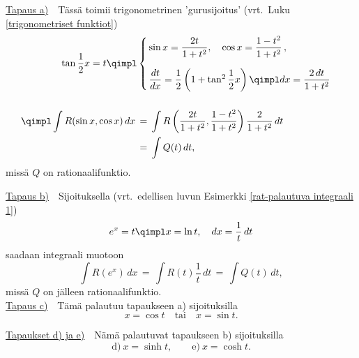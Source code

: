 \underline{Tapaus a)}\ \ Tässä toimii trigonometrinen 'gurusijoitus' 
(vrt.\ Luku \ref{trigonometriset funktiot})
\begin{align*}
\tan\frac{1}{2}x=t \qimpl &\begin{cases}
                        \,\sin x=\dfrac{2t}{1+t^2},\quad \cos x=\dfrac{1-t^2}{1+t^2}\,, \\[5mm] 
                        \,\dfrac{dt}{dx} = \dfrac{1}{2}\left(1+\tan^2\dfrac{1}{2}x\right) 
                                               \qimpl dx = \dfrac{2\, dt}{1+t^2}
                           \end{cases} \\[5mm]
\qimpl \int R(\sin x,\cos x)\,dx\, 
                          &=\, \int R\left(\frac{2t}{1+t^2},\frac{1-t^2}{1+t^2}\right)
                                                                   \frac{2}{1+t^2}\,dt \\
                          &=\, \int Q(t)\, dt,
\end{align*}
missä $Q$ on rationaalifunktio.

\underline{Tapaus b)}\ \ Sijoituksella (vrt.\ edellisen luvun Esimerkki 
\ref{rat-palautuva integraali 1})
\[
e^x = t \qimpl x=\ln t, \quad dx=\frac{1}{t}\,dt
\]
saadaan integraali muotoon 
\[
\int R(e^x)\,dx \,=\, \int R(t)\frac{1}{t}\,dt \,=\, \int Q(t)\,dt,
\]
missä $Q$ on jälleen rationaalifunktio. \\[5mm]
\underline{Tapaus c)}\ \ Tämä palautuu tapaukseen a) sijoituksilla
\[
x=\cos t \quad \text{tai} \quad x=\sin t.
\]

\underline{Tapaukset d) ja e)}\ \ Nämä palautuvat tapaukseen b) sijoituksilla
\[
\text{d)}\ x=\sinh t, \qquad \text{e)}\ x=\cosh t.
\]

